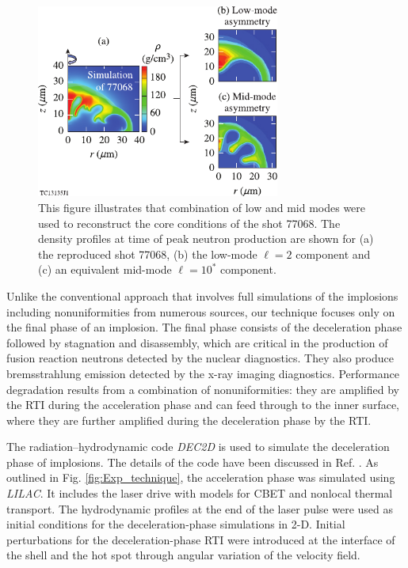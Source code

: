 \documentclass[aip,reprint]{revtex4-1}
\begin{document}
%
%
%
%
%
%
%
%
\begin{figure}
\includegraphics[width=80mm]{Fig5_Bose}
\caption{\label{fig:Exp_LowMid} This figure illustrates that combination of low and mid modes were used to reconstruct the core conditions of the shot 77068. The density profiles at time of peak neutron production are shown for (a) the reproduced shot 77068, (b) the low-mode $\ell=2$ component and (c) an equivalent mid-mode $\ell=10^*$ component.}
\end{figure}
%
%

Unlike the conventional approach that involves full simulations of the implosions including nonuniformities from numerous sources, our technique focuses only on the final phase of an implosion. The final phase consists of the deceleration phase followed by stagnation and disassembly, which are critical in the production of fusion reaction neutrons detected by the nuclear diagnostics. They also produce bremsstrahlung emission detected by the x-ray imaging diagnostics. Performance degradation results from a combination of nonuniformities: they are amplified by the RTI during the acceleration phase and can feed through to the inner surface, where they are further amplified during the deceleration phase by the RTI. 
%
%
%
%
%

 The radiation--hydrodynamic code \textit{DEC2D} is used to simulate the deceleration phase of implosions. The details of the code have been discussed in Ref. . As outlined in Fig. \ref{fig:Exp_technique}, the acceleration phase was simulated using \textit{LILAC}.\cite{Exp_LILAC1} It includes the laser drive with models for CBET\cite{Exp_LILAC2} and nonlocal thermal transport.\cite{ Exp_LILAC3} The hydrodynamic profiles at the end of the laser pulse were used as initial conditions for the deceleration-phase simulations in 2-D. Initial perturbations for the deceleration-phase RTI were introduced at the interface of the shell and the hot spot through angular variation of the velocity field.
%
%
\end{document}

